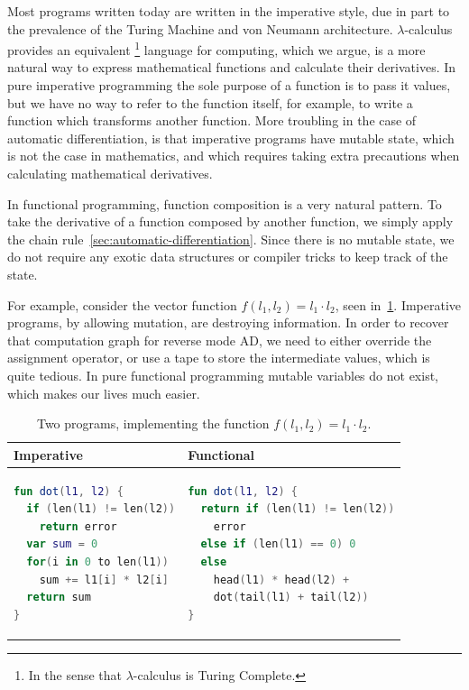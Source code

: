 \documentclass[12pt,initial,twoside,maitrise]{dms}
\numberwithin{equation}{section}
\numberwithin{table}{chapter}
\numberwithin{figure}{chapter}
\begin{document}
Most programs written today are written in the imperative style, due in part to the prevalence of the Turing Machine and von Neumann architecture. $\lambda$-calculus provides an equivalent \footnote{In the sense that $\lambda$-calculus is Turing Complete.} language for computing, which we argue, is a more natural way to express mathematical functions and calculate their derivatives. In pure imperative programming the sole purpose of a function is to pass it values, but we have no way to refer to the function itself, for example, to write a function which transforms another function. More troubling in the case of automatic differentiation, is that imperative programs have mutable state, which is not the case in mathematics, and which requires taking extra precautions when calculating mathematical derivatives.

In functional programming, function composition is a very natural pattern. To take the derivative of a function composed by another function, we simply apply the chain rule~\ref{sec:automatic-differentiation}. Since there is no mutable state, we do not require any exotic data structures or compiler tricks to keep track of the state.

For example, consider the vector function $f(l_1, l_2) = l_1 \cdot l_2$, seen in~\ref{tab:1}. Imperative programs, by allowing mutation, are destroying information. In order to recover that computation graph for reverse mode AD, we need to either override the assignment operator, or use a tape to store the intermediate values, which is quite tedious. In pure functional programming mutable variables do not exist, which makes our lives much easier.

\begin{table}[t]
    \centering
    \begin{tabular}{|l|l|}
        \hline
        Imperative & Functional \\
        \hline
        \begin{lstlisting}[language=Kotlin, linewidth=5.5cm]
fun dot(l1, l2) {
  if (len(l1) != len(l2))
    return error
  var sum = 0
  for(i in 0 to len(l1))
    sum += l1[i] * l2[i]
  return sum
}
        \end{lstlisting}
         &
        {\begin{lstlisting}[language=Kotlin, linewidth=5.5cm, numbers=none]
fun dot(l1, l2) {
  return if (len(l1) != len(l2))
    error
  else if (len(l1) == 0) 0
  else
    head(l1) * head(l2) +
    dot(tail(l1) + tail(l2))
}
        \end{lstlisting}}
        \\
        \hline
    \end{tabular}
    \caption{Two programs, implementing the function $f(l_1, l_2) = l_1 \cdot l_2$.}
    \label{tab:1}
\end{table}
\end{document}
